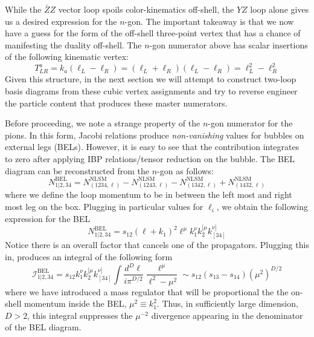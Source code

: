 \documentclass[11pt,letter]{article}
\begin{document}
While the $\bar{Z}Z$ vector loop spoils color-kinematics off-shell, the $Y\!Z$ loop alone gives us a desired expression for the $n$-gon. The important takeaway is that we now have a guess for the form of the off-shell three-point vertex that has a chance of manifesting the duality off-shell. The $n$-gon numerator above has scalar insertions of the following kinematic vertex:
\begin{equation}
T^{a}_{LR} = k_a(\ell_L-\ell_{R}) = (\ell_L+\ell_{R}) (\ell_L-\ell_{R})  = \ell_L^2-\ell_{R}^2 
\end{equation}
Given this structure, in the next section we will attempt to construct two-loop basis diagrams from these cubic vertex assignments and try to reverse engineer the particle content that produces these master numerators.

Before proceeding, we note a strange property of the $n$-gon numerator for the pions. In this form, Jacobi relations produce \textit{non-vanishing} values for bubbles on external legs (BELs). However, it is easy to see that the contribution integrates to zero after applying IBP relations/tensor reduction on the bubble. The BEL diagram can be reconstructed from the $n$-gon as follows:
\begin{equation}
N^{\text{BEL}}_{1|2,34} = N^{\text{NLSM}}_{(1234,\ell)}-N^{\text{NLSM}}_{(1243,\ell)}-N^{\text{NLSM}}_{(1342,\ell)}+N^{\text{NLSM}}_{(1432,\ell)}
\end{equation}
where we define the loop momentum to be in between the left most and right most leg on the box. Plugging in particular values for $\ell_i$, we obtain the following expression for the BEL
\begin{equation}
N^{\text{BEL}}_{1|2,34} = s_{12} (\ell+k_1)^2 \ell^{\mu} k_1^{\nu} k_2^{[\mu} k_{[34]}^{\nu]} 
\end{equation}
Notice there is an overall factor that cancels one of the propagators. Plugging this in, produces an integral of the following form
\begin{equation}
\mathcal{I}^{\text{BEL}}_{1|2,34} = s_{12} k_1^{\nu} k_2^{[\mu} k_{[34]}^{\nu]} \int \frac{d^D \ell}{i\pi^{D/2}} \frac{\ell^\mu }{\ell^2-\mu^2} \sim   s_{12}(s_{13}-s_{14}) (\mu^2)^{D/2}
\end{equation}
where we have introduced a mass regulator that will be proportional the the on-shell momentum inside the BEL, $\mu^2 \equiv k_1^2$. Thus, in sufficiently large dimension, $D>2$, this integral suppresses the $\mu^{-2}$ divergence appearing in the denominator of the BEL diagram. 



\end{document}
